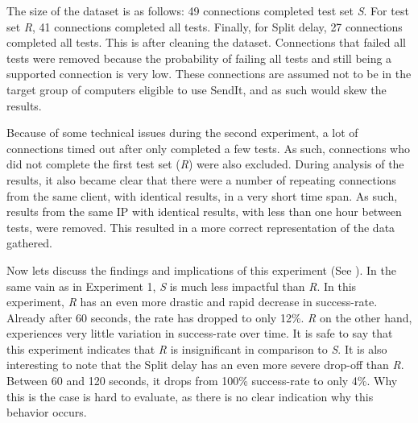 The size of the dataset is as follows: 49 connections completed test set \textit{S}. For test set \textit{R}, 41 connections completed all tests. Finally, for Split delay, 27 connections completed all tests. This is after cleaning the dataset. Connections that failed all tests were removed because the probability of failing all tests and still being a supported connection is very low. These connections are assumed not to be in the target group of computers eligible to use SendIt, and as such would skew the results.

Because of some technical issues during the second experiment, a lot of connections timed out after only completed a few tests. As such, connections who did not complete the first test set (\textit{R}) were also excluded. During analysis of the results, it also became clear that there were a number of repeating connections from the same client, with identical results, in a very short time span. As such, results from the same IP with identical results, with less than one hour between tests, were removed. This resulted in a more correct representation of the data gathered.

Now lets discuss the findings and implications of this experiment (See ). In the same vain as in Experiment 1, \textit{S} is much less impactful than \textit{R}. In this experiment, \textit{R} has an even more drastic and rapid decrease in success-rate. Already after 60 seconds, the rate has dropped to only 12\%. \textit{R} on the other hand, experiences very little variation in success-rate over time. It is safe to say that this experiment indicates that \textit{R} is insignificant in comparison to \textit{S}. It is also interesting to note that the Split delay has an even more severe drop-off than \textit{R}. Between 60 and 120 seconds, it drops from 100\% success-rate to only 4\%. Why this is the case is hard to evaluate, as there is no clear indication why this behavior occurs. 
%
%
